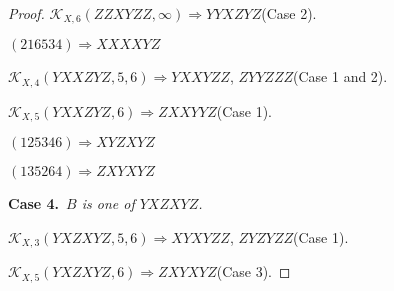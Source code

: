 \documentclass[12pt]{article}
\theoremstyle{plain}
\theoremstyle{definition}
\theoremstyle{remark}
\newcommand{\fancy}[1]{\mathcal{#1}}
\def\K{\fancy{K}}
\newcommand{\case}[2]{{\bf Case #1.}~{\it #2}~~}
\begin{document}
\begin{proof}
	$\K_{X,6}(ZZXYZZ,\infty)\Rightarrow $$YYXZYZ$(Case 2).
	
	
	
	$(2 1 6 5 3 4)\Rightarrow XXXXYZ$
	
	
	
	$\K_{X,4}(YXXZYZ,5, 6)\Rightarrow $$YXXYZZ$, $ZYYZZZ$(Case 1 and 2).
	
	$\K_{X,5}(YXXZYZ,6)\Rightarrow $$ZXXYYZ$(Case 1).
	
	
	
	$(1 2 5 3 4 6)\Rightarrow XYZXYZ$
	
	$(1 3 5 2 6 4)\Rightarrow ZXYXYZ$
	
	
	
	
	
	\bigskip
	\case{4}{$B$ is one of $YXZXYZ$.}
	
	\bigskip
	
	$\K_{X,3}(YXZXYZ,5, 6)\Rightarrow $$XYXYZZ$, $ZYZYZZ$(Case 1).
	
	$\K_{X,5}(YXZXYZ,6)\Rightarrow $$ZXYXYZ$(Case 3).
	
	
\end{proof}
\end{document}

